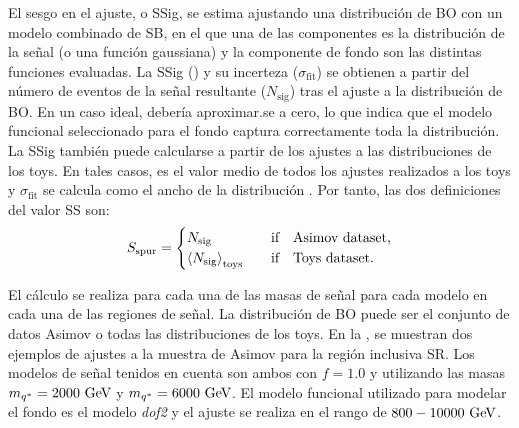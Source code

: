 El sesgo en el ajuste, o \acf{SSig}, se estima ajustando una distribución de \ac{BO} con un modelo combinado de \ac{SB}, en el que una de las componentes es la distribución de la señal (o una función gaussiana) y la componente de fondo son las distintas funciones evaluadas.
La \ac{SSig} (\sspur) y su incerteza (\(\sigma_{\text{fit}}\)) se obtienen a partir del número de eventos de la señal resultante (\(N_{\text{sig}}\)) tras el ajuste a la distribución de \ac{BO}. En un caso ideal, \sspur debería aproximar.se a cero, lo que indica que el modelo funcional seleccionado para el fondo captura correctamente toda la distribución.
La \ac{SSig} también puede calcularse a partir de los ajustes a las distribuciones de los toys. En tales casos, \sspur es el valor medio de todos los ajustes realizados a los toys y \(\sigma_{\text{fit}}\) se calcula como el ancho de la distribución \sspur. Por tanto, las dos definiciones del valor \ac{SS} son:
\begin{equation}
    \label{eq:bkg:modeling:sigbkg:sstest:sspur_definition_sstest}
    \sspur = 
    \begin{cases}
        N_{\text{sig}} & \qif \text{Asimov dataset},\\
        \expval{N_{\text{sig}}}_{\text{toys}} & \qif \text{Toys dataset}.
    \end{cases}
\end{equation}

El cálculo se realiza para cada una de las masas de señal para cada modelo en cada una de las regiones de señal. La distribución de \ac{BO} puede ser el conjunto de datos Asimov o todas las distribuciones de los toys. En la \Fig{\ref{fig:bkg:modeling:sigbkg:sstest:sstest_asimov_examples}}, se muestran dos ejemplos de ajustes a la muestra de Asimov para la región inclusiva SR. Los modelos de señal tenidos en cuenta son ambos \qstar con \(f=1.0\) y utilizando las masas \(m_{q^*} = 2000~\text{GeV}\) y \(m_{q^*} = 6000~\text{GeV}\). El modelo funcional utilizado para modelar el fondo es el modelo \textit{dof2} y el ajuste se realiza en el rango \myj de \(800-10000~\text{GeV}\).

